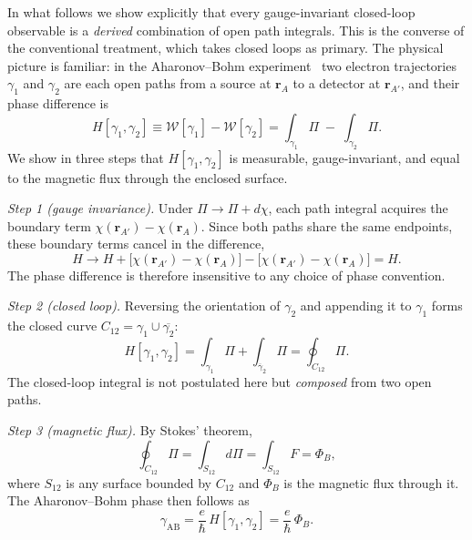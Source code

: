 \documentclass[%
 reprint, amsmath,amssymb, aps, prb, ]{revtex4-2}
\numberwithin{equation}{section}
\newcommand{\WL}{\mathcal{W}}
\begin{document}
In what follows we show explicitly that every gauge-invariant closed-loop observable is a \emph{derived} combination of open path integrals. This is the converse of the conventional treatment, which takes closed loops as primary. The physical picture is familiar: in the Aharonov--Bohm experiment~\cite{Aharonov1959,Tonomura1986} two electron trajectories $\gamma_1$ and $\gamma_2$ are each open paths from a source at $\mathbf{r}_A$ to a detector at $\mathbf{r}_{A'}$, and their phase difference is
\begin{equation}
H[\gamma_1, \gamma_2] \equiv \WL[\gamma_1] - \WL[\gamma_2]
= \int_{\gamma_1}\Pi \;-\; \int_{\gamma_2}\Pi.
\label{eq:H_def}
\end{equation}
We show in three steps that $H[\gamma_1,\gamma_2]$ is measurable, gauge-invariant, and equal to the magnetic flux through the enclosed surface.

\textit{Step 1 (gauge invariance).} Under $\Pi \to \Pi + d\chi$, each path integral acquires the boundary term $\chi(\mathbf{r}_{A'}) - \chi(\mathbf{r}_A)$. Since both paths share the same endpoints, these boundary terms cancel in the difference,
\begin{equation}
H \to H
+ \bigl[\chi(\mathbf{r}_{A'}) - \chi(\mathbf{r}_A)\bigr]
- \bigl[\chi(\mathbf{r}_{A'}) - \chi(\mathbf{r}_A)\bigr]
= H.
\label{eq:H_gauge}
\end{equation}
The phase difference is therefore insensitive to any choice of phase convention.

\textit{Step 2 (closed loop).} Reversing the orientation of $\gamma_2$ and appending it to $\gamma_1$ forms the closed curve $C_{12} = \gamma_1 \cup \overline{\gamma_2}$:
\begin{equation}
H[\gamma_1,\gamma_2]
= \int_{\gamma_1}\Pi + \int_{\overline{\gamma}_2}\Pi
= \oint_{C_{12}}\Pi.
\label{eq:H_loop}
\end{equation}
The closed-loop integral is not postulated here but \emph{composed} from two open paths.

\textit{Step 3 (magnetic flux).} By Stokes' theorem,
\begin{equation}
\oint_{C_{12}}\Pi = \int_{S_{12}}d\Pi = \int_{S_{12}}F = \Phi_B,
\label{eq:H_flux}
\end{equation}
where $S_{12}$ is any surface bounded by $C_{12}$ and $\Phi_B$ is the magnetic flux through it. The Aharonov--Bohm phase then follows as
\begin{equation}
\gamma_{\text{AB}} = \frac{e}{\hbar}\,H[\gamma_1,\gamma_2]
= \frac{e}{\hbar}\,\Phi_B.
\label{eq:AB_phase}
\end{equation}
\end{document}
